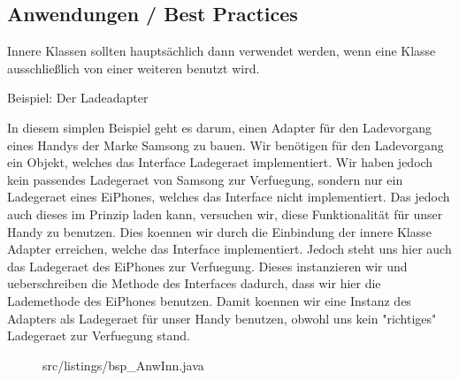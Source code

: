 \subsection{Anwendungen / Best Practices}

Innere Klassen sollten hauptsächlich dann verwendet werden, wenn eine Klasse ausschließlich von einer weiteren benutzt wird.

Beispiel: Der Ladeadapter

In diesem simplen Beispiel geht es darum, einen Adapter für den Ladevorgang eines Handys der Marke Samsong zu bauen.
 Wir benötigen für den Ladevorgang ein Objekt, welches das Interface Ladegeraet implementiert.
Wir haben jedoch kein passendes Ladegeraet von Samsong zur Verfuegung, sondern nur ein Ladegeraet eines EiPhones, welches das Interface nicht implementiert.
Das jedoch auch dieses im Prinzip laden kann, versuchen wir, diese Funktionalität für unser Handy zu benutzen.
Dies koennen wir durch die Einbindung der innere Klasse Adapter erreichen, welche das Interface implementiert.
Jedoch steht uns hier auch das Ladegeraet des EiPhones zur Verfuegung.
Dieses instanzieren wir und ueberschreiben die Methode des Interfaces dadurch, dass wir hier die Lademethode des EiPhones benutzen.
Damit koennen wir eine Instanz des Adapters als Ladegeraet für unser Handy benutzen, obwohl uns kein "richtiges" Ladegeraet zur Verfuegung stand.

\newpage
\begin{figure}[hb]
\lstset{language=Java}
 {src/listings/bsp_AnwInn.java}
\end{figure}


\newpage
